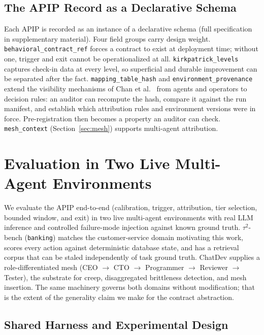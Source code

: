 \documentclass[conference]{IEEEtran}
\newcommand{\code}[1]{\texttt{\small #1}}
\begin{document}
\subsection{The APIP Record as a Declarative Schema}
\label{sec:schema}

Each APIP is recorded as an instance of a declarative schema (full
specification in supplementary material). Four field groups carry design
weight. \code{behavioral\_contract\_ref} forces a contract to exist at
deployment time; without one, trigger and exit cannot be operationalized at
all. \code{kirkpatrick\_levels} captures check-in data at every level, so
superficial and durable improvement can be separated after the fact.
\code{mapping\_table\_hash} and \code{environment\_provenance} extend the
visibility mechanisms of Chan et al.\ \cite{chan2024} from agents and operators
to decision rules: an auditor can recompute the hash, compare it against the
run manifest, and establish which attribution rules and environment versions
were in force. Pre-registration then becomes a property an auditor can check.
\code{mesh\_context} (Section~\ref{sec:mesh}) supports multi-agent attribution.

\section{Evaluation in Two Live Multi-Agent Environments}
\label{sec:evaluation}

We evaluate the APIP end-to-end (calibration, trigger, attribution, tier
selection, bounded window, and exit) in two live multi-agent environments with
real LLM inference and controlled failure-mode injection against known ground
truth. $\tau^2$-bench (\code{banking}) \cite{barres2025} matches the
customer-service domain motivating this work, scores every action against
deterministic database state, and has a retrieval corpus that can be staled
independently of task ground truth. ChatDev \cite{qian2024} supplies a
role-differentiated mesh (CEO $\rightarrow$ CTO $\rightarrow$ Programmer
$\rightarrow$ Reviewer $\rightarrow$ Tester), the substrate for creep,
disaggregated brittleness detection, and mesh insertion. The same machinery
governs both domains without modification; that is the extent of the
generality claim we make for the contract abstraction.

\subsection{Shared Harness and Experimental Design}
\end{document}
